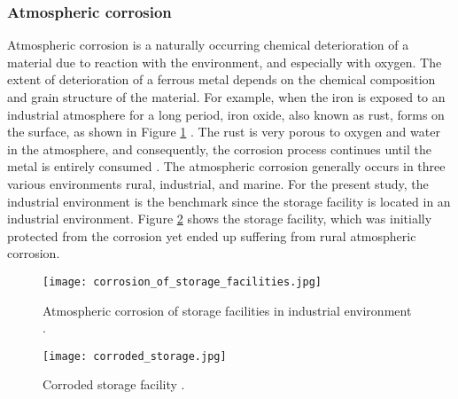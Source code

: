 \subsubsection{Atmospheric corrosion}
Atmospheric corrosion is a naturally occurring chemical deterioration of a material due to reaction with the environment, and especially with oxygen. The extent of deterioration of a ferrous metal depends on the chemical composition and grain structure of the material. For example, when the iron is exposed to an industrial atmosphere for a long period, iron oxide, also known as rust, forms on the surface, as shown in Figure \ref{ch3:figure:corrosion} \cite{mcarthur2004engineering}. The rust is very porous to oxygen and water in the atmosphere, and consequently, the corrosion process continues until the metal is entirely consumed \cite{protopopoff2011surface}.  The atmospheric corrosion generally occurs in three various environments rural, industrial, and marine. For the present study, the industrial environment is the benchmark since the storage facility is located in an industrial environment. Figure \ref{ch3:figure:corroded} shows the storage facility, which was initially protected from the corrosion yet ended up suffering from rural atmospheric corrosion.

\begin{figure}[H]
    \centering
    \texttt{[image: corrosion\_of\_storage\_facilities.jpg]}
    \caption{Atmospheric corrosion of storage facilities in industrial environment \cite{chigondo2016recent}.}
    \label{ch3:figure:corrosion}
\end{figure}
 
\begin{figure}[H]
    \centering
    \texttt{[image: corroded\_storage.jpg]}
    \caption{Corroded storage facility \cite{protopopoff2011surface}.}
    \label{ch3:figure:corroded}
\end{figure}

